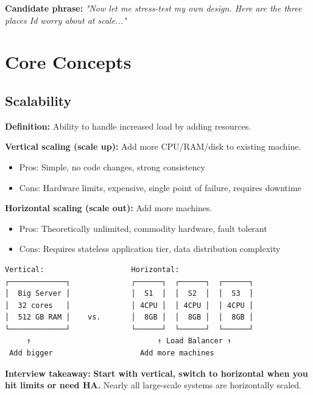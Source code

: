 \documentclass[11pt]{article}
\providecommand{\tightlist}{\setlength{\itemsep}{1pt}\setlength{\parskip}{0pt}}
\begin{document}
\textbf{Candidate phrase:} \emph{"Now let me stress-test my own design. Here are the three places I\textquotesingle d worry about at scale..."}

\section{Core Concepts}\label{core-concepts}

\subsection{Scalability}\label{scalability}

\textbf{Definition:} Ability to handle increased load by adding resources.

\textbf{Vertical scaling (scale up):} Add more CPU/RAM/disk to existing machine.

\begin{itemize}
\tightlist
\item
  Pros: Simple, no code changes, strong consistency
\item
  Cons: Hardware limits, expensive, single point of failure, requires downtime
\end{itemize}

\textbf{Horizontal scaling (scale out):} Add more machines.

\begin{itemize}
\tightlist
\item
  Pros: Theoretically unlimited, commodity hardware, fault tolerant
\item
  Cons: Requires stateless application tier, data distribution complexity
\end{itemize}

\setcodelang{}

\begin{verbatim}
Vertical:                    Horizontal:
┌─────────────┐              ┌──────┐  ┌──────┐  ┌──────┐
│  Big Server │              │  S1  │  │  S2  │  │  S3  │
│  32 cores   │              │ 4CPU │  │ 4CPU │  │ 4CPU │
│  512 GB RAM │    vs.       │  8GB │  │  8GB │  │  8GB │
└─────────────┘              └──────┘  └──────┘  └──────┘
     ↑                             ↑ Load Balancer ↑
 Add bigger                    Add more machines
\end{verbatim}

\textbf{Interview takeaway:} \textbf{Start with vertical, switch to horizontal when you hit limits or need HA.} Nearly all large-scale systems are horizontally scaled.
\end{document}
